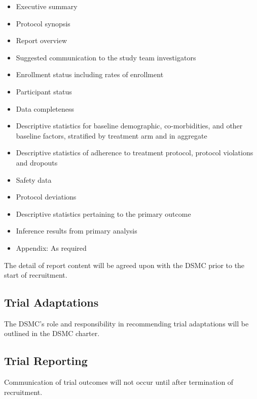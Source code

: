 \documentclass[11pt,parskip=half-]{scrartcl}
\providecommand{\tightlist}{%
  \setlength{\itemsep}{0pt}\setlength{\parskip}{0pt}}
\begin{document}
\begin{itemize}\tightlist
  \item
        Executive summary
  \item
        Protocol synopsis
  \item
        Report overview
  \item
        Suggested communication to the study team investigators
  \item
        Enrollment status including rates of enrollment
  \item
        Participant status
  \item
        Data completeness
  \item
        Descriptive statistics for baseline demographic, co-morbidities, and other baseline factors, stratified by treatment arm and in aggregate
  \item
        Descriptive statistics of adherence to treatment protocol, protocol violations and dropouts
  \item
        Safety data
  \item
        Protocol deviations
  \item
        Descriptive statistics pertaining to the primary outcome
  \item
        Inference results from primary analysis
  \item
        Appendix: As required
\end{itemize}

The detail of report content will be agreed upon with the DSMC prior to the start of recruitment.

\subsection{Trial Adaptations}\label{trial-adaptations}

The DSMC's role and responsibility in recommending trial adaptations will be outlined in the DSMC charter.

\subsection{Trial Reporting}\label{trial-reporting}

Communication of trial outcomes will not occur until after termination of recruitment.

\clearpage

\printbibliography[heading=bibintoc]

\end{document}
